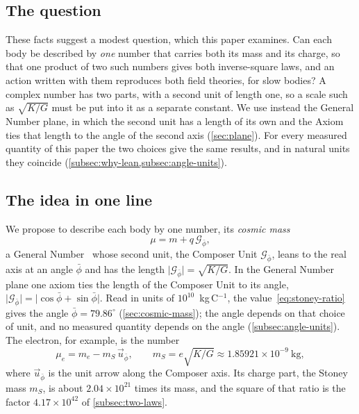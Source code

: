 \documentclass[11pt,a4paper]{article}
\newcommand{\pb}{\bar{\phi}}                    %
\newcommand{\Gp}{\mathcal{G}_{\bar{\phi}}}      %
\newcommand{\up}{\vec{u}_{\bar{\phi}}}          %
\theoremstyle{plain}
\theoremstyle{definition}
\theoremstyle{remark}
\begin{document}
\subsection{The question}\label{subsec:question}

These facts suggest a modest question, which this paper examines. Can each body be described by \emph{one} number that carries both its mass and its charge, so that one product of two such numbers gives both inverse-square laws, and an action written with them reproduces both field theories, for slow bodies? A complex number has two parts, with a second unit of length one, so a scale such as $\sqrt{K/G}$ must be put into it as a separate constant. We use instead the General Number plane, in which the second unit has a length of its own and the Axiom ties that length to the angle of the second axis (\cref{sec:plane}). For every measured quantity of this paper the two choices give the same results, and in natural units they coincide (\cref{subsec:why-lean,subsec:angle-units}).

\subsection{The idea in one line}\label{subsec:idea}

We propose to describe each body by one number, its \emph{cosmic mass}
\begin{equation}\label{eq:cosmic-mass}
\mu = m + q\,\Gp ,
\end{equation}
a General Number~\citep{DerrazGN2026} whose second unit, the Composer Unit $\Gp$, leans to the real axis at an angle $\pb$ and has the length $\lvert\Gp\rvert = \sqrt{K/G}$. In the General Number plane one axiom ties the length of the Composer Unit to its angle, $\lvert\Gp\rvert = \lvert\cos\pb + \sin\pb\rvert$. Read in units of $10^{10}$~kg\,C$^{-1}$, the value~\cref{eq:stoney-ratio} gives the angle $\pb = 79.86^\circ$ (\cref{sec:cosmic-mass}); the angle depends on that choice of unit, and no measured quantity depends on the angle (\cref{subsec:angle-units}). The electron, for example, is the number
\begin{equation}\label{eq:electron}
\mu_e = m_e - m_S\,\up , \qquad m_S = e\sqrt{K/G} \approx 1.85921 \times 10^{-9}\ \mathrm{kg} ,
\end{equation}
where $\up$ is the unit arrow along the Composer axis. Its charge part, the Stoney mass $m_S$, is about $2.04 \times 10^{21}$ times its mass, and the square of that ratio is the factor $4.17 \times 10^{42}$ of \cref{subsec:two-laws}.
\end{document}
